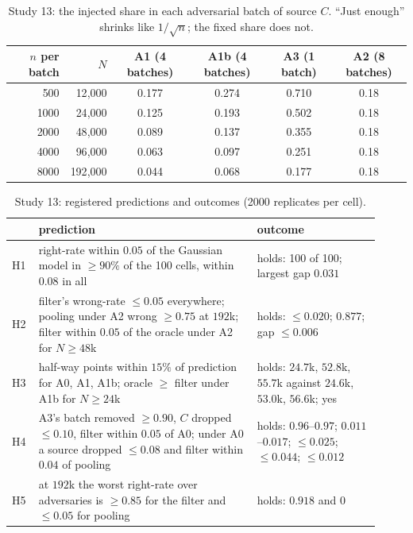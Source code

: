 \documentclass[11pt]{article}
\theoremstyle{definition}\newtheorem{definition}{Definition}\newtheorem{remark}{Remark}
\begin{document}
\begin{table}[!htbp]\centering\small
\begin{tabular}{rrcccc}\toprule
$n$ per batch & $N$ & A1 (4 batches) & A1b (4 batches) & A3 (1 batch) & A2 (8 batches)\\\midrule
500 & 12{,}000 & 0.177 & 0.274 & 0.710 & 0.18\\
1000 & 24{,}000 & 0.125 & 0.193 & 0.502 & 0.18\\
2000 & 48{,}000 & 0.089 & 0.137 & 0.355 & 0.18\\
4000 & 96{,}000 & 0.063 & 0.097 & 0.251 & 0.18\\
8000 & 192{,}000 & 0.044 & 0.068 & 0.177 & 0.18\\\bottomrule
\end{tabular}
\caption{Study 13: the injected share in each adversarial batch of source $C$. ``Just enough'' shrinks like $1/\sqrt n$; the fixed
share does not.}\label{tab:study13design}
\end{table}

\begin{table}[!htbp]\centering\small
\begin{tabular}{p{0.06\linewidth}p{0.55\linewidth}p{0.31\linewidth}}\toprule
& prediction & outcome\\\midrule
H1 & right-rate within $0.05$ of the Gaussian model in $\ge90\%$ of the 100 cells, within $0.08$ in all & holds: 100 of 100; largest gap $0.031$\\
H2 & filter's wrong-rate $\le0.05$ everywhere; pooling under A2 wrong $\ge0.75$ at $192$k; filter within $0.05$ of the oracle under A2 for $N\ge48$k & holds: $\le0.020$; $0.877$; gap $\le0.006$\\
H3 & half-way points within $15\%$ of prediction for A0, A1, A1b; oracle $\ge$ filter under A1b for $N\ge24$k & holds: $24.7$k, $52.8$k, $55.7$k against $24.6$k, $53.0$k, $56.6$k; yes\\
H4 & A3's batch removed $\ge0.90$, $C$ dropped $\le0.10$, filter within $0.05$ of A0; under A0 a source dropped $\le0.08$ and filter within $0.04$ of pooling & holds: $0.96$--$0.97$; $0.011$--$0.017$; $\le0.025$; $\le0.044$; $\le0.012$\\
H5 & at $192$k the worst right-rate over adversaries is $\ge0.85$ for the filter and $\le0.05$ for pooling & holds: $0.918$ and $0$\\\bottomrule
\end{tabular}
\caption{Study 13: registered predictions and outcomes (2000 replicates per cell).}\label{tab:study13}
\end{table}
\end{document}
